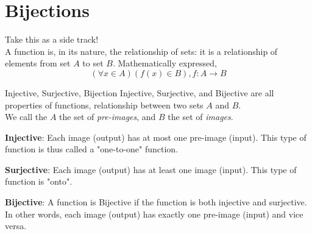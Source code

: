 \section{Bijections}
Take this as a side track! \\
A function is, in its nature, the relationship of sets: it is a relationship of elements from set $A$ to set $B$. Mathematically expressed, \\
\[(\forall x \in A) (f(x) \in B), f : A \rightarrow B\]
\begin{ln-define}{Injective, Surjective, Bijection}{}
    Injective, Surjective, and Bijective are all properties of functions, relationship between two sets $A$ and $B$. \\
    We call the $A$ the set of \textit{pre-images}, and $B$ the set of \textit{images}.
    \begin{bindenum}
        \item{
            \textbf{Injective}: Each image (output) has at most one pre-image (input). This type of function is thus called a "one-to-one" function.
            \begin{center}
            \end{center}
        }
        \item{
            \textbf{Surjective}: Each image (output) has at least one image (input). This type of function is "onto".
            \begin{center}
            \end{center}
        }
        \item {
            \textbf{Bijective}: A function is Bijective if the function is both injective and surjective. In other words, each image (output) has exactly one pre-image (input) and vice versa.
        }
    \end{bindenum}
\end{ln-define}
